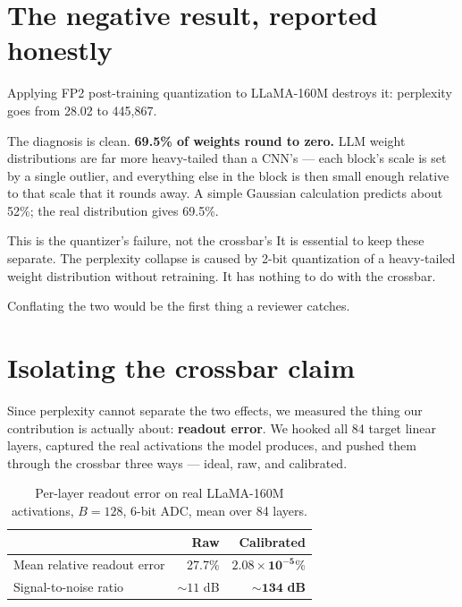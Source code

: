 \documentclass[11pt,a4paper]{report}
\begin{document}
\section{The negative result, reported honestly}

Applying FP2 post-training quantization to LLaMA-160M destroys it: perplexity
goes from 28.02 to 445{,}867.

The diagnosis is clean. \textbf{69.5\% of weights round to zero.} LLM weight
distributions are far more heavy-tailed than a CNN's --- each block's scale is
set by a single outlier, and everything else in the block is then small enough
relative to that scale that it rounds away. A simple Gaussian calculation
predicts about 52\%; the real distribution gives 69.5\%.

\begin{keybox}{This is the quantizer's failure, not the crossbar's}
It is essential to keep these separate. The perplexity collapse is caused by
2-bit quantization of a heavy-tailed weight distribution without retraining.
It has nothing to do with the crossbar.

Conflating the two would be the first thing a reviewer catches.
\end{keybox}

\section{Isolating the crossbar claim}

Since perplexity cannot separate the two effects, we measured the thing our
contribution is actually about: \textbf{readout error}. We hooked all 84
target linear layers, captured the real activations the model produces, and
pushed them through the crossbar three ways --- ideal, raw, and calibrated.

\begin{table}[h]
\centering
\caption{Per-layer readout error on real LLaMA-160M activations, $B = 128$,
6-bit ADC, mean over 84 layers.}
\begin{tabular}{lrr}
\toprule
 & Raw & \textbf{Calibrated} \\
\midrule
Mean relative readout error & 27.7\% & $\mathbf{2.08\times10^{-5}}$\% \\
Signal-to-noise ratio & ${\sim}11$ dB & $\mathbf{{\sim}134}$ \textbf{dB} \\
\bottomrule
\end{tabular}
\end{table}
\end{document}
